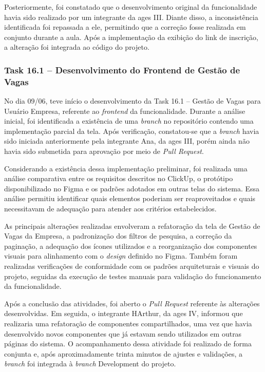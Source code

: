 Posteriormente, foi constatado que o desenvolvimento original da funcionalidade havia
sido realizado por um integrante da \ac{ages} III. Diante disso, a inconsistência
identificada foi repassada a ele, permitindo que a correção fosse realizada em conjunto
durante a aula. Após a implementação da exibição do link de inscrição, a alteração foi
integrada ao código do projeto.

\subsubsection*{Task 16.1 -- Desenvolvimento do Frontend de Gestão de Vagas}

No dia 09/06, teve início o desenvolvimento da Task 16.1 -- Gestão de Vagas para
Usuário Empresa, referente ao \textit{frontend} da funcionalidade. Durante a análise
inicial, foi identificada a existência de uma \textit{branch} no repositório contendo
uma implementação parcial da tela. Após verificação, constatou-se que a
\textit{branch} havia sido iniciada anteriormente pela integrante Ana, da \ac{ages}
III, porém ainda não havia sido submetida para aprovação por meio de
\textit{Pull Request}.

Considerando a existência dessa implementação preliminar, foi realizada uma análise
comparativa entre os requisitos descritos no ClickUp, o protótipo disponibilizado no
Figma e os padrões adotados em outras telas do sistema. Essa análise permitiu
identificar quais elementos poderiam ser reaproveitados e quais necessitavam de
adequação para atender aos critérios estabelecidos.

As principais alterações realizadas envolveram a refatoração da tela de Gestão de
Vagas da Empresa, a padronização dos filtros de pesquisa, a correção da paginação,
a adequação dos ícones utilizados e a reorganização dos componentes visuais para
alinhamento com o \textit{design} definido no Figma. Também foram realizadas
verificações de conformidade com os padrões arquiteturais e visuais do projeto,
seguidas da execução de testes manuais para validação do funcionamento da
funcionalidade.

Após a conclusão das atividades, foi aberto o \textit{Pull Request} referente às
alterações desenvolvidas. Em seguida, o integrante HArthur, da \ac{ages} IV, informou
que realizaria uma refatoração de componentes compartilhados, uma vez que havia
desenvolvido novos componentes que já estavam sendo utilizados em outras páginas do
sistema. O acompanhamento dessa atividade foi realizado de forma conjunta e, após
aproximadamente trinta minutos de ajustes e validações, a \textit{branch} foi integrada
à \textit{branch} Development do projeto.

